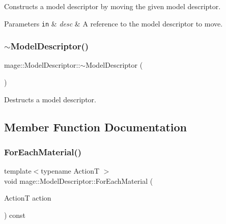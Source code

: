 Constructs a model descriptor by moving the given model descriptor.


\begin{DoxyParams}[1]{Parameters}
\mbox{\tt in}  & {\em desc} & A reference to the model descriptor to move. \\
\hline
\end{DoxyParams}
\hypertarget{classmage_1_1_model_descriptor_aae13cf050ee7f9283d91282c04f62df1}{}\label{classmage_1_1_model_descriptor_aae13cf050ee7f9283d91282c04f62df1} 
\subsubsection{\texorpdfstring{$\sim$\+Model\+Descriptor()}{~ModelDescriptor()}}
{\footnotesize\ttfamily mage\+::\+Model\+Descriptor\+::$\sim$\+Model\+Descriptor (\begin{DoxyParamCaption}{ }\end{DoxyParamCaption})\hspace{0.3cm}{\ttfamily [virtual]}}

Destructs a model descriptor. 

\subsection{Member Function Documentation}
\hypertarget{classmage_1_1_model_descriptor_ac4723e18238b0d6ac3c54168b8e9a09f}{}\label{classmage_1_1_model_descriptor_ac4723e18238b0d6ac3c54168b8e9a09f} 
\subsubsection{\texorpdfstring{For\+Each\+Material()}{ForEachMaterial()}}
{\footnotesize\ttfamily template$<$typename ActionT $>$ \\
void mage\+::\+Model\+Descriptor\+::\+For\+Each\+Material (\begin{DoxyParamCaption}\item[{ActionT}]{action }\end{DoxyParamCaption}) const}

